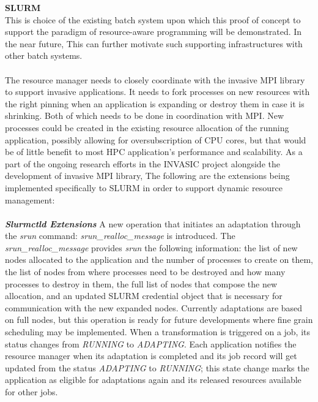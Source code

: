 \textbf{SLURM}\\
This is choice of the existing batch system upon which this proof of concept to support the paradigm of resource-aware programming will be demonstrated. In the near future, This can further motivate such supporting infrastructures with other batch systems.\\ \\
\noindent
The resource manager needs to closely coordinate with the invasive MPI library to support invasive applications. It needs to fork processes on new resources with the right pinning when an application is expanding or destroy them in case it is shrinking. Both of which needs to be done in coordination with MPI. New processes could be created in the existing resource allocation of the running application, possibly allowing for oversubscription of CPU cores, but that would be of little benefit to most HPC application's performance and scalability. As a part of the ongoing research efforts in the INVASIC project alongside the development of invasive MPI library, The following are the extensions being implemented specifically to SLURM in order to support dynamic resource management:\\ \\
\textbf{\textit{Slurmctld Extensions}} A new operation that initiates an adaptation through the \textit{srun} command: \textit{srun{\_}realloc{\_}message} is introduced. The \textit{srun{\_}realloc{\_}message} provides \textit{srun} the following information: the list of new nodes allocated to the application and the number of processes to create on them, the list of nodes from where processes need to be destroyed and how many processes to destroy in them, the full list of nodes that compose the new allocation, and an updated SLURM credential object that is necessary for communication with the new expanded nodes. Currently adaptations are based on full nodes, but this operation is ready for future developments where fine grain scheduling may be implemented. When a transformation is triggered on a job, its status changes from \textit{RUNNING} to \textit{ADAPTING}. Each application notifies the resource manager when its adaptation is completed and its job record will get updated from the status \textit{ADAPTING} to \textit{RUNNING}; this state change marks the application as eligible for adaptations again and its released resources available for other jobs.\\ \\
